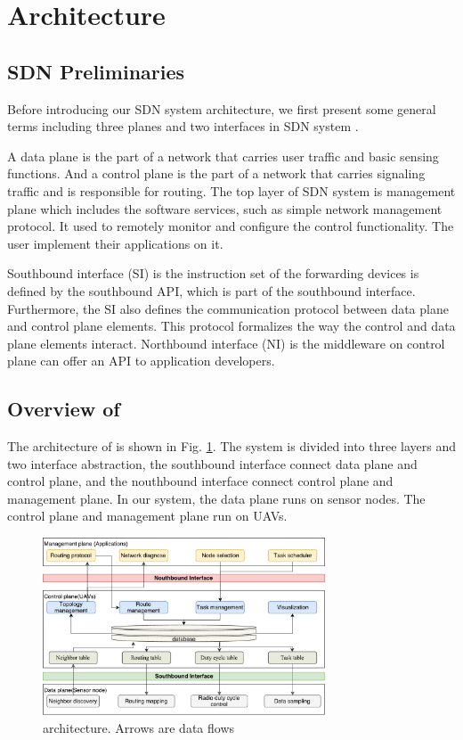 \section{Architecture}
\label{Arc}
\subsection{SDN Preliminaries}
Before introducing our SDN system architecture, we first present some general terms including three planes and two interfaces in SDN system \cite{kreutz2015software}.

A data plane is the part of a network that carries user traffic and basic sensing functions. And a control plane is the part of a network that carries signaling traffic and is responsible for routing. The top layer of SDN system is management plane which includes the software services, such as simple network management protocol. It used to remotely monitor and configure the control functionality. The user implement their applications on it.

Southbound interface (SI) is the instruction set of the forwarding devices is defined by the southbound API, which is part of the southbound interface. Furthermore, the SI also defines the communication protocol between data plane and control plane elements. This protocol formalizes the way the control and data plane elements interact. Northbound interface (NI) is the middleware on control plane can offer an API to application developers.

\subsection{Overview of {\sdn}}
The architecture of {\sdn} is shown in Fig. \ref{Architecture}. 
The system is divided into three layers and two interface abstraction, the southbound interface connect data plane and control plane, and the nouthbound interface connect control plane and management plane. In our system, the data plane runs on sensor nodes. The control plane and management plane run on UAVs.
\begin{figure}[htbp]
	\centering
	\includegraphics[width=3.3in]{./Figure/Architecture}
	\caption{{\sdn} architecture. \textnormal{Arrows are data flows}}
	\label{Architecture}
\end{figure}

